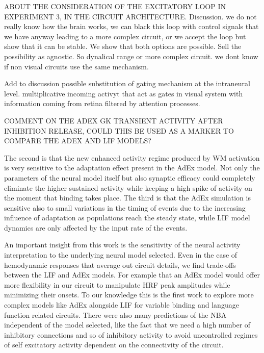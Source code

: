 \documentclass[10pt]{article}
\begin{document}
ABOUT THE CONSIDERATION OF THE EXCITATORY LOOP IN EXPERIMENT 3, IN THE CIRCUIT ARCHITECTURE. Discussion. we do not really know how the brain works, we can black this loop with control signals that we have anyway leading to a more complex circuit, or we accept the loop but show that it can be stable. We show that both options are possible. Sell the possibility as agnostic. So dynalical range or more complex circuit. we dont know if non visual circuits use the same mechanism.


Add to discussion possible substitution of gating mechanism at the intraneural level. multiplicative incoming activyt that act as gates in visual system with information coming from retina filtered by attention processes.


COMMENT ON THE ADEX GK TRANSIENT ACTIVITY AFTER INHIBITION RELEASE, COULD THIS BE USED AS A MARKER TO COMPARE THE ADEX AND LIF MODELS?

The second is that the new enhanced activity regime produced by WM activation is very sensitive to the adaptation effect present in the AdEx model.
Not only the parameters of the neural model itself but also synaptic efficacy could completely eliminate the higher sustained activity while keeping a high spike of activity on the moment that binding takes place.
The third is that the AdEx simulation is sensitive also to small variations in the timing of events due to the increasing influence of adaptation as populations reach the steady state, while LIF model dynamics are only affected by the input rate of the events.



An important insight from this work is the sensitivity of the neural activity interpretation to the underlying neural model selected.
Even in the case of hemodynamic responses that average out circuit details, we find trade-offs between the LIF and AdEx models.
For example that an AdEx model would offer more flexibility in our circuit to manipulate HRF peak amplitudes while minimizing their onsets.
To our knowledge this is the first work to explore more complex models like AdEx alongside LIF for variable binding and language function related circuits.
There were also many predictions of the NBA independent of the model selected, like the fact that we need a high number of inhibitory connections and so of inhibitory activity to avoid uncontrolled regimes of self excitatory activity dependent on the connectivity of the circuit.
\end{document}
